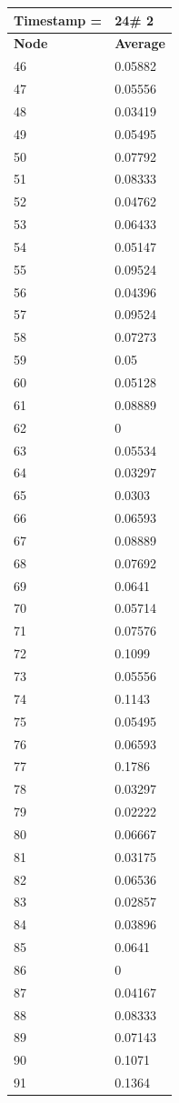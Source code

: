 \begin{tabular}{|l||l|}
\hline
\textbf{Timestamp =} & \textbf{24}\# 2\\\hline
	\textbf{Node} & \textbf{Average} \\ \hline
\hline
	46 & 0.05882 \\ \hline
	47 & 0.05556 \\ \hline
	48 & 0.03419 \\ \hline
	49 & 0.05495 \\ \hline
	50 & 0.07792 \\ \hline
	51 & 0.08333 \\ \hline
	52 & 0.04762 \\ \hline
	53 & 0.06433 \\ \hline
	54 & 0.05147 \\ \hline
	55 & 0.09524 \\ \hline
	56 & 0.04396 \\ \hline
	57 & 0.09524 \\ \hline
	58 & 0.07273 \\ \hline
	59 & 0.05 \\ \hline
	60 & 0.05128 \\ \hline
	61 & 0.08889 \\ \hline
	62 & 0 \\ \hline
	63 & 0.05534 \\ \hline
	64 & 0.03297 \\ \hline
	65 & 0.0303 \\ \hline
	66 & 0.06593 \\ \hline
	67 & 0.08889 \\ \hline
	68 & 0.07692 \\ \hline
	69 & 0.0641 \\ \hline
	70 & 0.05714 \\ \hline
	71 & 0.07576 \\ \hline
	72 & 0.1099 \\ \hline
	73 & 0.05556 \\ \hline
	74 & 0.1143 \\ \hline
	75 & 0.05495 \\ \hline
	76 & 0.06593 \\ \hline
	77 & 0.1786 \\ \hline
	78 & 0.03297 \\ \hline
	79 & 0.02222 \\ \hline
	80 & 0.06667 \\ \hline
	81 & 0.03175 \\ \hline
	82 & 0.06536 \\ \hline
	83 & 0.02857 \\ \hline
	84 & 0.03896 \\ \hline
	85 & 0.0641 \\ \hline
	86 & 0 \\ \hline
	87 & 0.04167 \\ \hline
	88 & 0.08333 \\ \hline
	89 & 0.07143 \\ \hline
	90 & 0.1071 \\ \hline
	91 & 0.1364 \\ \hline
\end{tabular}

